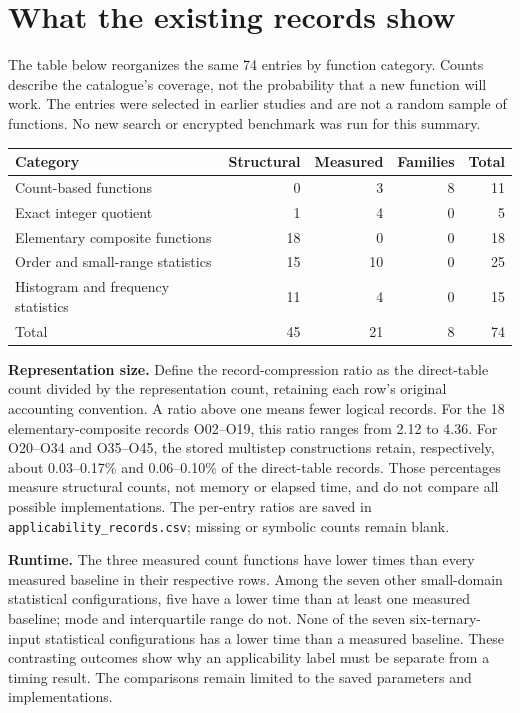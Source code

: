 \documentclass[a4paper,10pt]{article}
\newif\ifappmarked
\newcommand{\appadd}[1]{\ifappmarked{\color{blue}#1}\else#1\fi}
\begin{document}
\newpage
\section*{\appadd{What the existing records show}}
\appadd{The table below reorganizes the same 74 entries by function category. Counts describe the catalogue's coverage, not the probability that a new function will work. The entries were selected in earlier studies and are not a random sample of functions. No new search or encrypted benchmark was run for this summary.}

\appadd{%
\begin{center}
\begin{tabular}{@{}p{65mm}rrrr@{}}
\toprule
Category & Structural & Measured & Families & Total\\\midrule
Count-based functions & 0 & 3 & 8 & 11\\
Exact integer quotient & 1 & 4 & 0 & 5\\
Elementary composite functions & 18 & 0 & 0 & 18\\
Order and small-range statistics & 15 & 10 & 0 & 25\\
Histogram and frequency statistics & 11 & 4 & 0 & 15\\\midrule
Total & 45 & 21 & 8 & 74\\
\bottomrule
\end{tabular}
\end{center}}

\appadd{\textbf{Representation size.} Define the record-compression ratio as the direct-table count divided by the representation count, retaining each row's original accounting convention. A ratio above one means fewer logical records. For the 18 elementary-composite records O02--O19, this ratio ranges from 2.12 to 4.36. For O20--O34 and O35--O45, the stored multistep constructions retain, respectively, about 0.03--0.17\% and 0.06--0.10\% of the direct-table records. Those percentages measure structural counts, not memory or elapsed time, and do not compare all possible implementations. The per-entry ratios are saved in \texttt{applicability\_records.csv}; missing or symbolic counts remain blank.}

\appadd{\textbf{Runtime.} The three measured count functions have lower times than every measured baseline in their respective rows. Among the seven other small-domain statistical configurations, five have a lower time than at least one measured baseline; mode and interquartile range do not. None of the seven six-ternary-input statistical configurations has a lower time than a measured baseline. These contrasting outcomes show why an applicability label must be separate from a timing result. The comparisons remain limited to the saved parameters and implementations.}
\end{document}
